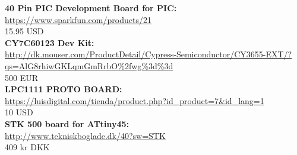 \textbf{40 Pin PIC Development Board for PIC:}\\
\url{https://www.sparkfun.com/products/21}\\
15.95 USD\\

\textbf{CY7C60123 Dev Kit:}\\
\url{http://dk.mouser.com/ProductDetail/Cypress-Semiconductor/CY3655-EXT/?qs=AlG8rhiwGKLqmGmRrbO\%2fwg\%3d\%3d}\\
500 EUR\\

\textbf{LPC1111 PROTO BOARD:}\\
\url{https://luisdigital.com/tienda/product.php?id_product=7&id_lang=1}\\
10 USD\\

\textbf{STK 500 board for ATtiny45:}\\
\url{http://www.tekniskboglade.dk/40?sw=STK}\\
409 kr DKK\\
